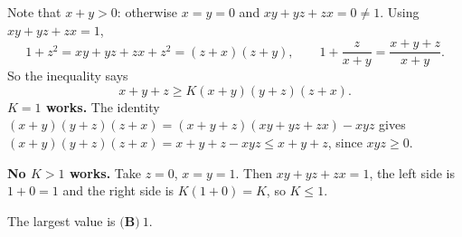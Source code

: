 Note that $x+y>0$: otherwise $x=y=0$ and $xy+yz+zx=0\ne1$. Using $xy+yz+zx=1$,
\[
1+z^2=xy+yz+zx+z^2=(z+x)(z+y),\qquad 1+\dfrac{z}{x+y}=\dfrac{x+y+z}{x+y}.
\]
So the inequality says
\[
x+y+z\ge K(x+y)(y+z)(z+x).
\]
\textbf{$K=1$ works.} The identity $(x+y)(y+z)(z+x)=(x+y+z)(xy+yz+zx)-xyz$ gives $(x+y)(y+z)(z+x)=x+y+z-xyz\le x+y+z$, since $xyz\ge0$.

\textbf{No $K>1$ works.} Take $z=0$, $x=y=1$. Then $xy+yz+zx=1$, the left side is $1+0=1$ and the right side is $K(1+0)=K$, so $K\le1$.

The largest value is $\boxed{\textbf{(B)}\ 1}$.
